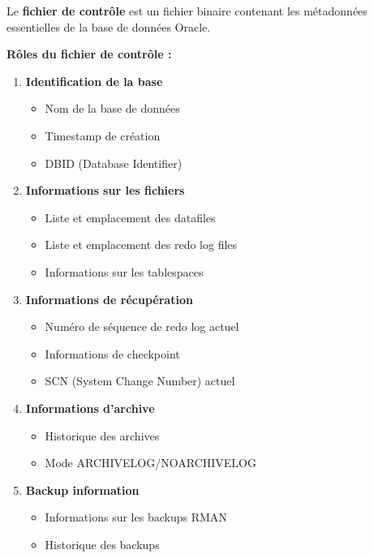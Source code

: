 \documentclass[11pt,a4paper]{article}
\begin{document}
\begin{definitionbox}
Le \textbf{fichier de contrôle} est un fichier binaire contenant les métadonnées essentielles de la base de données Oracle.
\end{definitionbox}

\textbf{Rôles du fichier de contrôle :}

\begin{enumerate}
    \item \textbf{Identification de la base}
    \begin{itemize}
        \item Nom de la base de données
        \item Timestamp de création
        \item DBID (Database Identifier)
    \end{itemize}
    
    \item \textbf{Informations sur les fichiers}
    \begin{itemize}
        \item Liste et emplacement des datafiles
        \item Liste et emplacement des redo log files
        \item Informations sur les tablespaces
    \end{itemize}
    
    \item \textbf{Informations de récupération}
    \begin{itemize}
        \item Numéro de séquence de redo log actuel
        \item Informations de checkpoint
        \item SCN (System Change Number) actuel
    \end{itemize}
    
    \item \textbf{Informations d'archive}
    \begin{itemize}
        \item Historique des archives
        \item Mode ARCHIVELOG/NOARCHIVELOG
    \end{itemize}
    
    \item \textbf{Backup information}
    \begin{itemize}
        \item Informations sur les backups RMAN
        \item Historique des backups
    \end{itemize}
\end{enumerate}
\end{document}
